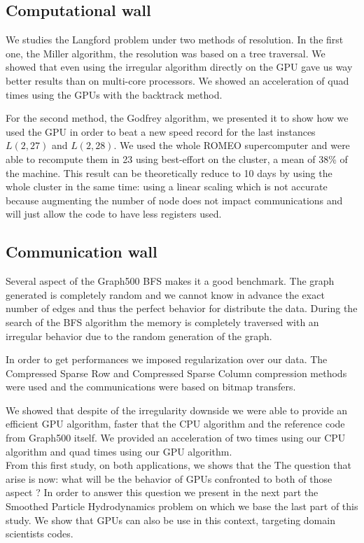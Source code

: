 \subsection{Computational wall}
We studies the Langford problem under two methods of resolution. 
In the first one, the Miller algorithm, the resolution was based on a tree traversal. 
We showed that even using the irregular algorithm directly on the GPU gave us way better results than on multi-core processors. 
We showed an acceleration of quad times using the GPUs with the backtrack method.

For the second method, the Godfrey algorithm, we presented it to show how we used the GPU in order to beat a new speed record for the last instances $L(2,27)$ and $L(2,28)$.
We used the whole ROMEO supercomputer and were able to recompute them in 23 using best-effort on the cluster, a mean of 38\% of the machine.
This result can be theoretically reduce to 10 days by using the whole cluster in the same time:
 using a linear scaling which is not accurate because augmenting the number of node does not impact communications and will just allow the code to have less registers used. 

\subsection{Communication wall}
Several aspect of the Graph500 BFS makes it a good benchmark. 
The graph generated is completely random and we cannot know in advance the exact number of edges and thus the perfect behavior for distribute the data. 
During the search of the BFS algorithm the memory is completely traversed with an irregular behavior due to the random generation of the graph. 

In order to get performances we imposed regularization over our data.
The Compressed Sparse Row and Compressed Sparse Column compression methods were used and the communications were based on bitmap transfers. 

We showed that despite of the irregularity downside we were able to provide an efficient GPU algorithm, faster that the CPU algorithm and the reference code from Graph500 itself.
We provided an acceleration of two times using our CPU algorithm and quad times using our GPU algorithm.\\


From this first study, on both applications, we shows that the 
The question that arise is now: what will be the behavior of GPUs confronted to both of those aspect ? 
In order to answer this question we present in the next part the Smoothed Particle Hydrodynamics problem on which we base the last part of this study. 
We show that GPUs can also be use in this context, targeting domain scientists codes.
